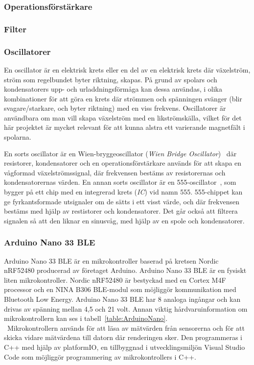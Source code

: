 \documentclass[a4paper]{article}
\begin{document}
\begin{sloppypar}
    \subsubsection{Operationsförstärkare}
    \subsubsection{Filter}
    \subsubsection{Oscillatorer}
    En oscillator är en elektrisk krets eller en del av en elektrisk krets där växelström, ström som regelbundet byter riktning, skapas.
    På grund av spolars och kondensatorers upp- och urladdningsförmåga kan dessa användas, i olika kombinationer för att göra en krets där strömmen och spänningen svänger (blir svagare/starkare, och byter riktning) med en viss frekvens.
    Oscillatorer är användbara om man vill skapa växelström med en likströmskälla, vilket för det här projektet är mycket relevant för att kunna alstra ett varierande magnetfält i spolarna.

    En sorts oscillator är en Wien-bryggeoscillator (\textit{Wien Bridge Oscillator})~\cite{WienBridge} där resistorer, kondensatorer och en operationsförstärkare används för att skapa en vågformad växelströmssignal, där frekvensen bestäms av resistorernas och kondensatorernas värden.
    En annan sorts oscillator är en 555-oscillator~\cite{555_sine}, som bygger på ett chip med en integrerad krets (\textit{IC}) vid namn 555. 555-chippet kan ge fyrkantsformade utsignaler om de sätts i ett visst värde, och där frekvensen bestäms med hjälp av restistorer och kondensatorer. Det går också att filtrera signalen så att den liknar en sinusvåg, med hjälp av en spole och kondensatorer.

    \subsubsection{Arduino Nano 33 BLE}
    Arduino Nano 33 BLE är en mikrokontroller baserad på kretsen Nordic nRF52480 producerad av företaget Arduino.
    Arduino Nano 33 BLE är en fysiskt liten mikrokontroller. Nordic nRF52480 är bestyckad med en Cortex M4F processor
    och en NINA B306 BLE-modul som möjliggör kommunikation med Bluetooth Low Energy. Arduino Nano 33 BLE har 8 analoga
    ingångar och kan drivas av spänning mellan 4,5 och 21 volt. Annan viktig hårdvaruinformation om mikrokontrollern
    kan ses i tabell~\ref{table:ArduinoNano}. ~\cite{Arduino:ABX00030}\\\
    Mikrokontrollern används för att läsa av mätvärden från sensorerna och för att skicka vidare mätvärdena till
    datorn där renderingen sker. Den programmeras i C++ med hjälp av platformIO, en tillbyggnad i utvecklingsmiljön
    Visual Studio Code som möjliggör programmering av mikrokontrollers i C++.


\end{sloppypar}
\end{document}
